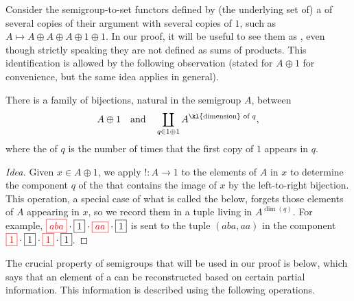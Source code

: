 Consider the semigroup-to-set functors defined by (the underlying set of) a
 of several copies of their argument with several copies of $1$,
such as $A \mapsto A \oplus A \oplus A \oplus 1 \oplus 1$. In our proof, it will
be useful to see them as , even though strictly speaking
they are not defined as sums of products. This identification is allowed by the
following observation (stated for $A\oplus1$ for convenience, but the same idea
applies in general).
\begin{proposition}\label{prop:coproduct-as-polynomial-functor}
  There is a family of bijections, natural in the semigroup $A$, between
  \begin{align*}
    A \oplus 1 \quad \text{and} \quad \coprod_{q \in 1 \oplus 1} A^{\text{\kl{dimension} of $q$}},
  \end{align*}
  where the  of $q$ is the number of times that the
  first copy of $1$ appears in $q$.
\end{proposition}
\begin{proof}[Idea]
  Given $x\in A\oplus1$, we apply $!\colon A\to1$ to the elements of $A$ in $x$
  to determine the component $q$ of the  that contains
  the image of $x$ by the left-to-right bijection. This operation, a special
  case of what is called the  below, forgets those elements of $A$
  appearing in $x$, so we record them in a tuple living in $A^{\dim(q)}$. For
  example, ${\color{red}\boxed{aba}} \cdot {\boxed{1}} \cdot {\color{red}\boxed{aa}} \cdot
  \boxed{1}$ is sent to the tuple $(aba,aa)$ in the component ${\color{red}\boxed{1}}
  \cdot {\boxed{1}} \cdot {\color{red}\boxed{1}} \cdot \boxed{1}$.
\end{proof}

The crucial property of semigroups that will be used in our proof is  below, which says that an element of a  can be reconstructed based on certain partial information. This information is described  using the following operations.

